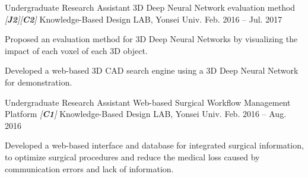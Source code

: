 \begin{cventries}

\cventry
{Undergraduate Research Assistant} %
{3D Deep Neural Network evaluation method \textit{[\textbf{J2}][\textbf{C2}]}} %
{Knowledge-Based Design LAB, Yonsei Univ.} %
{Feb. 2016 – Jul. 2017} %
{ %
\begin{cvitems}
\item {Proposed an evaluation method for 3D Deep Neural Networks by visualizing the impact of each voxel of each 3D object.}
\item {Developed a web-based 3D CAD search engine using a 3D Deep Neural Network for demonstration.}
\end{cvitems}
}

\cventry
{Undergraduate Research Assistant} %
{Web-based Surgical Workflow Management Platform \textit{[\textbf{C1}]}} %
{Knowledge-Based Design LAB, Yonsei Univ.} %
{Feb. 2016 – Aug. 2016} %
{ %
\begin{cvitems}
\item {Developed a web-based interface and database for integrated surgical information, to optimize surgical procedures and reduce the medical loss caused by communication errors and lack of information. }
\end{cvitems}
}

\end{cventries}